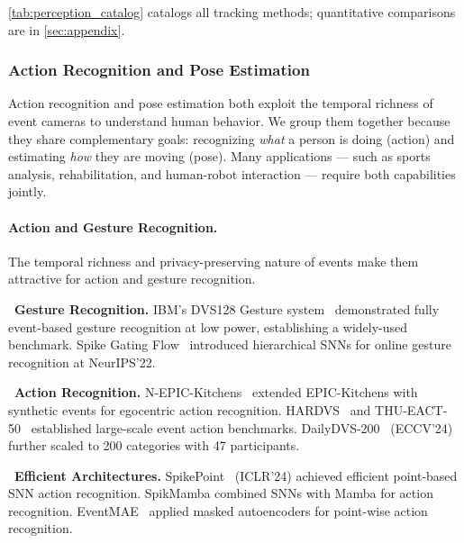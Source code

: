 \cref{tab:perception_catalog} catalogs all tracking methods; quantitative comparisons are in \cref{sec:appendix}.


\subsubsection{Action Recognition and Pose Estimation}
\label{sec:perception_action_pose}

Action recognition and pose estimation both exploit the temporal richness of event cameras to understand human behavior. We group them together because they share complementary goals: recognizing \textit{what} a person is doing (action) and estimating \textit{how} they are moving (pose). Many applications --- such as sports analysis, rehabilitation, and human-robot interaction --- require both capabilities jointly.

\paragraph{Action and Gesture Recognition.}
The temporal richness and privacy-preserving nature of events make them attractive for action and gesture recognition.

\noindent{}~\textbf{Gesture Recognition.} IBM's DVS128 Gesture system~\cite{amir2017dvs128gesture} demonstrated fully event-based gesture recognition at low power, establishing a widely-used benchmark. Spike Gating Flow~\cite{zhang2022spikegatingflow} introduced hierarchical SNNs for online gesture recognition at NeurIPS'22.

\noindent{}~\textbf{Action Recognition.} N-EPIC-Kitchens~\cite{plizzari2022nepickitchens} extended EPIC-Kitchens with synthetic events for egocentric action recognition. HARDVS~\cite{wang2023hardvs} and THU-EACT-50~\cite{gao2023thueact} established large-scale event action benchmarks. DailyDVS-200~\cite{wang2024dailydvs200} (ECCV'24) further scaled to 200 categories with 47 participants.

\noindent{}~\textbf{Efficient Architectures.} SpikePoint~\cite{ren2024spikepoint} (ICLR'24) achieved efficient point-based SNN action recognition. SpikMamba combined SNNs with Mamba for action recognition. EventMAE~\cite{chen2025eventmae} applied masked autoencoders for point-wise action recognition.

